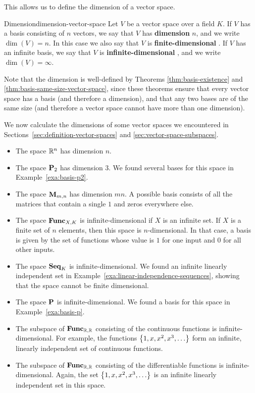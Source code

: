 This allows us to define the dimension of a vector space.

\begin{definition}{Dimension}{dimension-vector-space}
  Let $V$ be a vector space over a field $K$. If $V$ has a basis
  consisting of $n$ vectors, we say that $V$ has \textbf{dimension}%
   $n$, and we write $\dim(V)=n$. In
  this case we also say that $V$ is \textbf{finite-dimensional}%
  . If $V$ has an infinite
  basis, we say that $V$ is \textbf{infinite-dimensional}%
  , and we write $\dim(V) = \infty$.
\end{definition}

Note that the dimension is well-defined by Theorems
{\ref{thm:basis-existence}} and
{\ref{thm:basis-same-size-vector-space}}, since these theorems ensure
that every vector space has a basis (and therefore a dimension), and
that any two bases are of the same size (and therefore a vector space
cannot have more than one dimension).

We now calculate the dimensions of some vector spaces we encountered in
Sections~\ref{sec:definition-vector-spaces} and
{\ref{sec:vector-space-subspaces}}.

\begin{itemize}
\item The space $\mathbb{R}^n$ has dimension $n$.
\item The space $\mathbf{P}_2$ has dimension $3$. We found several bases
  for this space in Example~\ref{exa:basis-p2}.
\item The space $\mathbf{M}_{m,n}$ has dimension $mn$. A possible basis
  consists of all the matrices that contain a single $1$ and zeros
  everywhere else.
\item The space $\mathbf{Func}_{X,K}$ is infinite-dimensional if $X$ is an
  infinite set. If $X$ is a finite set of $n$ elements, then this
  space is $n$-dimensional. In that case, a basis is given by the set
  of functions whose value is $1$ for one input and $0$ for all other
  inputs.
\item The space $\mathbf{Seq}_K$ is infinite-dimensional. We found an infinite
  linearly independent set in
  Example~\ref{exa:linear-independence-sequences}, showing that the
  space cannot be finite dimensional.
\item The space $\mathbf{P}$ is infinite-dimensional. We found a basis for
  this space in Example~\ref{exa:basis-p}.
\item The subspace of $\mathbf{Func}_{\mathbb{R},\mathbb{R}}$ consisting of the continuous
  functions is infinite-dimensional. For example, the functions
  $\left\{1,x,x^2,x^3,\ldots\right\}$ form an infinite, linearly independent
  set of continuous functions.
\item The subspace of $\mathbf{Func}_{\mathbb{R},\mathbb{R}}$ consisting of the differentiable
  functions is infinite-dimensional. Again, the set
  $\left\{1,x,x^2,x^3,\ldots\right\}$ is an infinite linearly independent set
  in this space.
\end{itemize}

